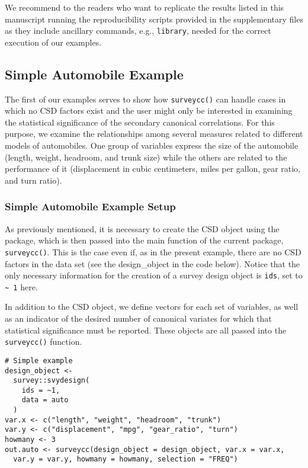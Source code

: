 We recommend to the readers who want to replicate the results listed in this manuscript running the reproducibility scripts provided in the supplementary files as they include ancillary commands, e.g., \texttt{library}, needed for the correct execution of our examples.

\hypertarget{simple-automobile-example}{%
\subsection{Simple Automobile Example}\label{simple-automobile-example}}

The first of our examples serves to show how \texttt{surveycc()} can handle cases in which no CSD factors exist and the user might only be interested in examining the statistical significance of the secondary canonical correlations. For this purpose, we examine the relationships among several measures related to different models of automobiles. One group of variables express the size of the automobile (length, weight, headroom, and trunk size) while the others are related to the performance of it (displacement in cubic centimeters, miles per gallon, gear ratio, and turn ratio).

\hypertarget{simple-automobile-example-setup}{%
\subsubsection{Simple Automobile Example Setup}\label{simple-automobile-example-setup}}

As previously mentioned, it is necessary to create the CSD object using the  package, which is then passed into the main function of the current package, \texttt{surveycc()}. This is the case even if, as in the present example, there are no CSD factors in the data set (see the design\_object in the code below). Notice that the only necessary information for the creation of a survey design object is \texttt{ids}, set to \texttt{\textasciitilde{}\ 1} here.

In addition to the CSD object, we define vectors for each set of variables, as well as an indicator of the desired number of canonical variates for which that statistical significance must be reported. These objects are all passed into the \texttt{surveycc()} function.

\begin{verbatim}
# Simple example
design_object <-
  survey::svydesign(
    ids = ~1,
    data = auto
  )
var.x <- c("length", "weight", "headroom", "trunk")
var.y <- c("displacement", "mpg", "gear_ratio", "turn")
howmany <- 3
out.auto <- surveycc(design_object = design_object, var.x = var.x,
  var.y = var.y, howmany = howmany, selection = "FREQ")
\end{verbatim}

